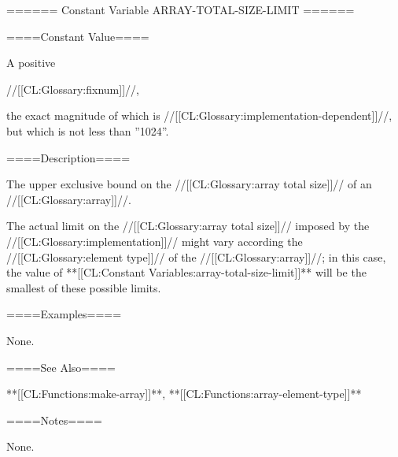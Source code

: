 ====== Constant Variable ARRAY-TOTAL-SIZE-LIMIT ======

====Constant Value====

A positive

//[[CL:Glossary:fixnum]]//,

the exact magnitude of which is //[[CL:Glossary:implementation-dependent]]//, but which is not less than ''1024''.

====Description====

The upper exclusive bound on the //[[CL:Glossary:array total size]]// of an //[[CL:Glossary:array]]//.

The actual limit on the //[[CL:Glossary:array total size]]// imposed by the //[[CL:Glossary:implementation]]// might vary according the //[[CL:Glossary:element type]]// of the //[[CL:Glossary:array]]//; in this case, the value of **[[CL:Constant Variables:array-total-size-limit]]** will be the smallest of these possible limits.

====Examples====

None.

====See Also====

**[[CL:Functions:make-array]]**, **[[CL:Functions:array-element-type]]**

====Notes====

None.

